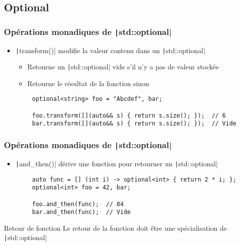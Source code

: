 \documentclass[C++.tex]{subfiles}
\begin{document}
\subsection*{Optional}
\begin{frame}[fragile]
	\frametitle{Opérations monadiques de \texttt|std::optional|}
	\begin{itemize}
		\item \texttt|transform()| modifie la valeur contenu dans un \texttt|std::optional|


		\begin{itemize}
			\item Retourne un \texttt|std::optional| vide s'il n'y a pas de valeur stockée
			\item Retourne le résultat de la fonction sinon
		\end{itemize}
	\end{itemize}

	\begin{verbatim}
		optional<string> foo = "Abcdef", bar;

		foo.transform([](auto&& s) { return s.size(); });  // 6
		bar.transform([](auto&& s) { return s.size(); });  // Vide
	\end{verbatim}

\end{frame}

\begin{frame}[fragile]
	\frametitle{Opérations monadiques de \texttt|std::optional|}
	\begin{itemize}
		\item \texttt|and_then()| dérive une fonction pour retourner un \texttt|std::optional|
	\end{itemize}

	\begin{verbatim}
		auto func = [] (int i) -> optional<int> { return 2 * i; };
		optional<int> foo = 42, bar;

		foo.and_then(func);  // 84
		bar.and_then(func);  // Vide
	\end{verbatim}

	\begin{alertblock}{Retour de fonction}
		Le retour de la fonction doit être une spécialisation de \texttt|std::optional|
	\end{alertblock}
\end{frame}
\end{document}
